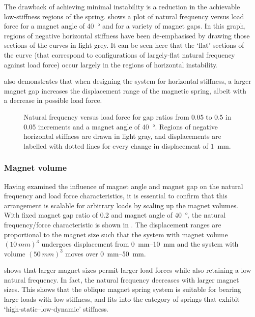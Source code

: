 The drawback of achieving minimal instability is a reduction in the achievable low-stiffness regions of the spring.  shows a plot of natural frequency versus load force for a magnet angle of \SI{40}{\degree} and for a variety of magnet gaps. In this graph, regions of negative horizontal stiffness have been de-emphasised by drawing those sections of the curves in light grey. It can be seen here that the `flat' sections of the curve (that correspond to configurations of largely-flat natural frequency against load force) occur largely in the regions of horizontal instability.

 also demonstrates that when designing the system for horizontal stiffness, a larger magnet gap increases the displacement range of the magnetic spring, albeit with a decrease in possible load force.

\begin{figure}
\centering
{}
\caption{Natural frequency versus load force for gap ratios from \num{0.05} to \num{0.5} in \num{0.05} increments and a magnet angle of \SI{40}{\degree}. Regions of negative horizontal stiffness are drawn in light gray, and displacements are labelled with dotted lines for every change in displacement of \SI{1}{mm}.}
\end{figure}

\subsubsection{Magnet volume}

Having examined the influence of magnet angle and magnet gap on the natural frequency and load force characteristics, it is essential to confirm that this arrangement is scalable for arbitrary loads by scaling up the magnet volumes. With fixed magnet gap ratio of 0.2 and magnet angle of \SI{40}{\degree}, the natural frequency/force characteristic is shown in . The displacement ranges are proportional to the magnet size such that the system with magnet volume $(\SI{10}{mm})^3$ undergoes displacement from \SIrange{0}{10}{mm} and the system with volume $(\SI{50}{mm})^3$ moves over \SIrange{0}{50}{mm}.

 shows that larger magnet sizes permit larger load forces while also retaining a low natural frequency. In fact, the natural frequency decreases with larger magnet sizes. This shows that the oblique magnet spring system is suitable for bearing large loads with low stiffness, and fits into the category of springs that exhibit `high-static--low-dynamic' stiffness.

